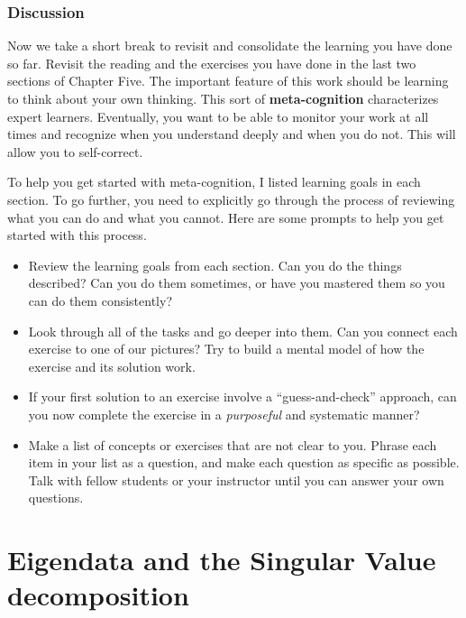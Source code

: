 \documentclass[10pt,]{book}
\newcommand{\terminology}[1]{\textbf{#1}}
\theoremstyle{plain}
\theoremstyle{definition}
\numberwithin{equation}{section}
\begin{document}
\subsection[Discussion]{Discussion}\label{subsection-125}
Now we take a short break to revisit and consolidate the learning you
      have done so far. Revisit the reading and the exercises you have done in
      the last two sections of Chapter Five. The important feature of this work should be
      learning to think about your own thinking. This sort of \terminology{meta-cognition}
      characterizes expert learners. Eventually, you want to be able to monitor
      your work at all times and recognize when you understand deeply and when
      you do not. This will allow you to self-correct.
\par
To help you get started with meta-cognition, I listed learning goals in
      each section. To go further, you need to explicitly go through the process
      of reviewing what you can do and what you cannot. Here are some prompts to
      help you get started with this process.
      \begin{itemize}
\item{}
          Review the learning goals from each section. Can you do the things
          described? Can you do them sometimes, or have you mastered them so you
          can do them consistently?
        \item{}
          Look through all of the tasks and go deeper into them. Can you
          connect each exercise to one of our pictures? Try to build a mental
          model of how the exercise and its solution work.
        \item{}
          If your first solution to an exercise involve a ``guess-and-check''
          approach, can you now complete the exercise in a \emph{purposeful}
          and systematic manner?
        \item{}
          Make a list of concepts or exercises that are not clear to you. Phrase
          each item in your list as a question, and make each question as
          specific as possible. Talk with fellow students or your
          instructor until you can answer your own questions.
        \end{itemize}

\clearpage
\typeout{************************************************}
\typeout{************************************************}
\chapter[Eigendata and the Singular Value decomposition]{Eigendata and the Singular Value decomposition}\label{chapter-eigendata-and-svd}
\end{document}

